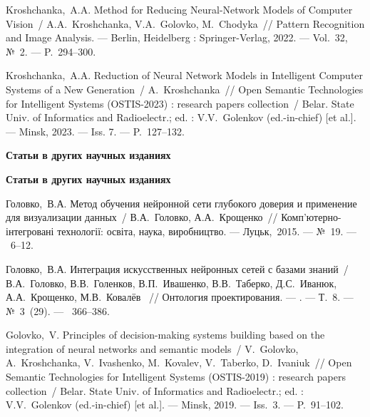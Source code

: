 Kroshchanka,~A.A. Method for Reducing Neural-Network Models of Computer Vision~/ A.A.~Kroshchanka, V.A.~Golovko, M.~Chodyka~//
\newblock Pattern Recognition and Image Analysis. ---
\newblock Berlin, Heidelberg : Springer-Verlag, 2022. ---
\newblock Vol.~32, №~2. ---
\newblock P.~294--300.

Kroshchanka,~A.A. Reduction of Neural Network Models in Intelligent Computer Systems of a New Generation~/ A.~Kroshchanka~// 
\newblock Open Semantic Technologies for Intelligent Systems (OSTIS-2023) : research papers collection~/
\newblock Belar. State Univ. of Informatics and Radioelectr.; ed. : V.V.~Golenkov (ed.-in-chief) [et al.]. ---
\newblock Minsk, 2023. ---
\newblock Iss. 7. ---
\newblock P.~127--132.

\ifx\isabstract\undefined 
\begin{center}
\vspace{3mm}
{\bf Статьи в других научных изданиях}
\vspace{3mm}
\end{center}
\else
\vspace{2mm}
{\bf Статьи в других научных изданиях}
\vspace{2mm}
\fi

Головко,~В.А. Метод обучения нейронной сети глубокого доверия и применение для визуализации данных~/ В.А.~Головко, А.А.~Крощенко~//
\newblock Комп'ютерно-інтегровані технології: освіта, наука, виробництво. ---
\newblock Луцьк,~2015. ---
\newblock №~19. ---
~6--12.

Головко,~В.А. Интеграция искусственных нейронных сетей с базами знаний~/ В.А.~Головко, В.В.~Голенков, В.П.~Ивашенко, В.В.~Таберко, Д.С.~Иванюк, А.А.~Крощенко, М.В.~Ковалёв ~//
\newblock Онтология проектирования. ---
. ---
\newblock Т.~8. ---
\newblock №~3~(29). ---
~366--386.

Golovko,~V. Principles of decision-making systems building based on the integration of neural networks and semantic models~/ V.~Golovko, A.~Kroshchanka, V.~Ivashenko, M.~Kovalev, V.~Taberko, D.~Ivaniuk~//
\newblock Open Semantic Technologies for Intelligent Systems (OSTIS-2019) : research papers collection~/
\newblock Belar. State Univ. of Informatics and Radioelectr.; ed. : V.V.~Golenkov (ed.-in-chief) [et al.]. ---
\newblock Minsk, 2019. ---
\newblock Iss.~3. ---
\newblock P.~91--102.

